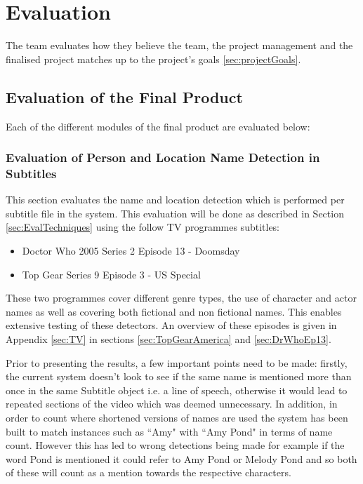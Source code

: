 \section{Evaluation}
\label{sec:Evaluation}

The team evaluates how they believe the team, the project management and the
finalised project matches up to the project's goals \ref{sec:projectGoals}.

\subsection{Evaluation of the Final Product}

Each of the different modules of the final product are evaluated below: 

\subsubsection{Evaluation of Person and Location Name Detection in Subtitles}
This section evaluates the name and location detection which is performed per subtitle file in the system. This evaluation will be done as described in Section \ref{sec:EvalTechniques} using the follow TV programmes subtitles:
\begin{itemize}
	\item{Doctor Who 2005 Series 2 Episode 13 - Doomsday}
	\item{Top Gear Series 9 Episode 3 - US Special}
\end{itemize}

These two programmes cover different genre types, the use of character and actor names as well as covering both fictional and non fictional names. This enables extensive testing of these detectors. An overview of these episodes is given in Appendix \ref{sec:TV} in sections \ref{sec:TopGearAmerica} and \ref{sec:DrWhoEp13}.

Prior to presenting the results, a few important points need to be made: firstly, the current system doesn’t look to see if the same name is mentioned more than once in the same Subtitle object i.e. a line of speech, otherwise it would lead to repeated sections of the video which was deemed unnecessary. In addition, in order to count where shortened versions of names are used the system has been built to match instances such as ``Amy" with ``Amy Pond" in terms of name count. However this has led to wrong detections being made for example if the word Pond is mentioned it could refer to Amy Pond or Melody Pond and so both of these will count as a mention towards the respective characters.

